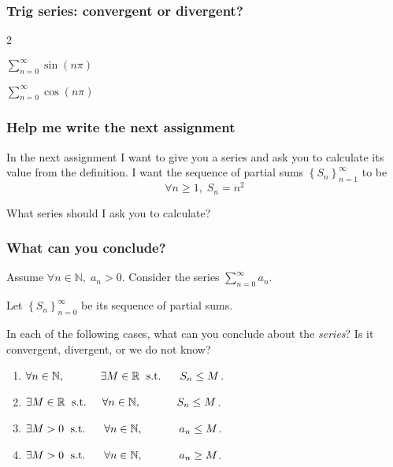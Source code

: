 \documentclass[14pt]{beamer}
\newcommand{\R}{\mathbb{R}}
\newcommand{\N}{\mathbb{N}}
\newcommand{\setsize}[1]{\fontsize{#1}{#1}\selectfont} %
\newcommand{\smallerfont}{\setsize{13}} %
\newcommand{\vv}{\vspace{.5cm}}
\begin{document}
	\begin{frame}[t]
		\frametitle{Trig series: convergent or divergent?}

		\begin{enumerate}
		\end{enumerate}
	\end{frame}
	\begin{frame}[t]
		\frametitle{Help me write the next assignment}

		In the next assignment I want to give you a series and ask you to calculate
		its value from the definition. I want the sequence of partial sums ${\displaystyle \left\{ S_n \right\}_{n=1}^{\infty}}$
		to be
		\[
			\forall n \geq 1, \; S_{n} = n^{2}
		\]

		What series should I ask you to calculate?
	\end{frame}
	\begin{frame}[t]
		\smallerfont
		\frametitle{What can you conclude?}

		Assume ${\displaystyle \forall n \in \N, \; a_n >0}$. Consider the series ${\displaystyle \sum_{n=0}^{\infty} a_n}$.

		Let ${\displaystyle \left\{ S_n \right\}_{n=0}^{\infty}}$ be its sequence of
		partial sums. \vv

		In each of the following cases, what can you conclude about the \emph{series}?
		Is it convergent, divergent, or we do not know? \vv

		\begin{enumerate}
			\item ${\displaystyle \forall n \in \N, \; \mbox{ \phantom{s.t.} } \quad \exists M \in \R \; \mbox{ s.t. } \; \quad S_n \leq M}$.

			\item ${\displaystyle \exists M \in \R \; \mbox{ s.t. } \quad \forall n \in \N, \; \mbox{ \phantom{s.t.} } \quad S_n \leq M}$.

			\item ${\displaystyle \exists M >0 \; \mbox{ s.t. } \; \quad \forall n \in \N, \; \mbox{ \phantom{s.t.} } \quad a_n \leq M}$.

			\item ${\displaystyle \exists M >0 \; \mbox{ s.t. } \; \quad \forall n \in \N, \; \mbox{ \phantom{s.t.} } \quad a_n \geq M}$.
		\end{enumerate}
	\end{frame}
\end{document}
